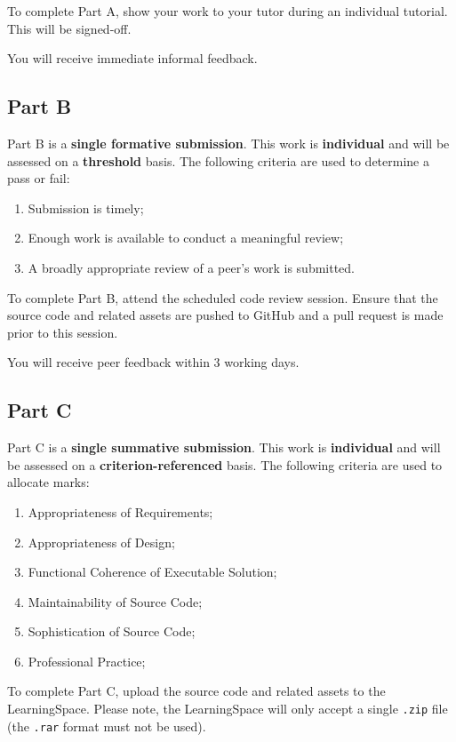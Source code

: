 \documentclass{../fal_assignment}
\begin{document}
To complete Part A, show your work to your tutor during an individual tutorial. This will be signed-off. 

You will receive immediate informal feedback.

\subsection*{Part B}

Part B is a \textbf{single formative submission}. This work is \textbf{individual} and will be assessed on a \textbf{threshold} basis. The following criteria are used to determine a pass or fail:

\begin{enumerate}[label=(\alph*)]
	\item Submission is timely;
	\item Enough work is available to conduct a meaningful review;
	\item A broadly appropriate review of a peer's work is submitted.
\end{enumerate}

To complete Part B, attend the scheduled code review session. Ensure that the source code and related assets are pushed to GitHub and a pull request is made prior to this session. 

You will receive peer feedback within 3 working days.

\subsection*{Part C}

Part C is a \textbf{single summative submission}. This work is \textbf{individual} and will be assessed on a \textbf{criterion-referenced} basis. The following criteria are used to allocate marks:

\begin{enumerate}[label=(\alph*)]
	\item Appropriateness of Requirements;
	\item Appropriateness of Design;
	\item Functional Coherence of Executable Solution;
	\item Maintainability of Source Code;
	\item Sophistication of Source Code;
	\item Professional Practice;
\end{enumerate}

To complete Part C, upload the source code and related assets to the LearningSpace. Please note, the LearningSpace will only accept a single \texttt{.zip} file (the \texttt{.rar} format must not be used). 
\end{document}
